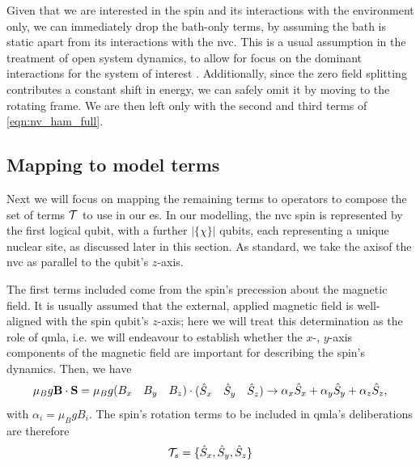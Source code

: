 Given that we are interested in the spin and its interactions with the environment only, 
    we can immediately drop the bath-only terms, by assuming the bath is static 
    apart from its interactions with the \gls{nvc}. 
This is a usual assumption in the treatment of open system dynamics, 
    to allow for focus on the dominant interactions for the system of interest \cite{breuer2002theory}. 
Additionally, since the zero field splitting contributes a constant shift in energy, 
    we can safely omit it by moving to the rotating frame. 
We are then left only with the second and third terms of \cref{eqn:nv_ham_full}. 

\subsection{Mapping to model terms}
Next we will focus on mapping the remaining terms to operators to compose the set of terms 
    $\mathcal{T}$ to use in our \gls{es}. 
In our modelling, the \gls{nvc} spin is represented by the first logical qubit, 
    with a further $|\{\chi\}|$ qubits, each representing a unique nuclear site, 
    as discussed later in this section. 
As standard, we take the axis\footnotemark of the \gls{nvc} as parallel to the qubit's $z$-axis. 

\par 

The first terms included come from the spin's precession about the magnetic field. 
It is usually assumed that the external, applied magnetic field is well-aligned with the 
    spin qubit's $z$-axis; here we will treat this determination as the role of \gls{qmla}, 
    i.e. we will endeavour to establish whether the $x$-, $y$-axis components of the magnetic field 
    are important for describing the spin's dynamics. 
Then, we have
\begin{equation}
    \mu_B g \mathbf{B} \cdot \mathbf{S} 
    = \mu_B g \begin{matrix}(B_x & B_y & B_z)\end{matrix} \cdot \begin{matrix}(\hat{S}_x & \hat{S}_y & \hat{S}_z)\end{matrix}
    \rightarrow \alpha_x \hat{S}_x + \alpha_y \hat{S}_y + \alpha_z \hat{S}_z,
\end{equation}
with $\alpha_i = \mu_B g B_i$. 
The spin's rotation terms to be included in \gls{qmla}'s deliberations are therefore 
\begin{equation}
    \label{eqn:exp_spin_terms}
    \mathcal{T}_{s} = \{ \hat{S}_x, \hat{S}_y, \hat{S}_z\}
\end{equation}
\par 

